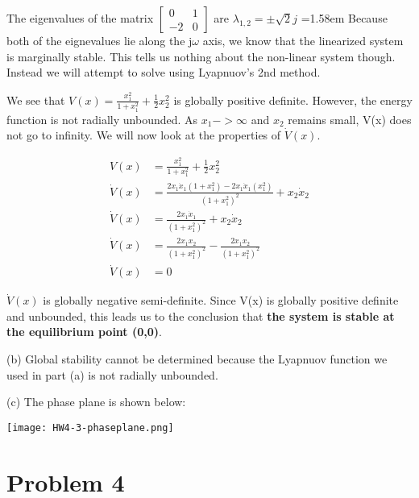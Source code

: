 \documentclass{article}
\begin{document}
  The eigenvalues of the matrix $\begin{bmatrix}
      0 & 1 \\
      -2 & 0
  \end{bmatrix}$ are $\lambda_{1,2} = \pm \sqrt{2}j$
  \newline
  \hangindent=1.58em
   Because both of the eignevalues lie along the j$\omega$ axis, we
  know that the linearized system is marginally stable. This tells us nothing
  about the non-linear system though. Instead we will attempt to solve using
  Lyapnuov's 2nd method. \newpage

  We see that $V(x)=\frac{x_1^2}{1+x_1^2}+\frac{1}{2}x_2^2$ is globally positive
  definite. However, the energy function is not radially unbounded. As
  $x_1 -> \infty$ and $x_2$ remains small, V(x) does not go to infinity.
  We will now look at the properties of $\dot{V}(x)$.

  \begin{align*}
    V(x) &= \frac{x_1^2}{1+x_1^2}+\frac{1}{2}x_2^2 \\
    \dot{V}(x) &= \frac{2x_1\dot{x}_1(1+x_1^2)-2x_1\dot{x}_1(x_1^2)}{(1+x_1^2)^2} + x_2\dot{x}_2 \\
    \dot{V}(x) &= \frac{2x_1\dot{x}_1}{(1+x_1^2)^2} + x_2\dot{x}_2 \\
    \dot{V}(x) &= \frac{2x_1x_2}{(1+x_1^2)^2} - \frac{2x_1x_2}{(1+x_1^2)^2} \\
    \dot{V}(x) &= 0
  \end{align*}
  
  $\dot{V}(x)$ is globally negative semi-definite. Since V(x) is
  globally positive definite and unbounded, this leads us to the conclusion that
  \textbf{the system is stable at the equilibrium point (0,0)}.

  (b) Global stability cannot be determined because the Lyapnuov function we
  used in part (a) is not radially unbounded. \newline

  (c) The phase plane is shown below: \newline
  \begin{center}
    \texttt{[image: HW4-3-phaseplane.png]} \newline \newline
  \end{center}
  \newpage

  \section{Problem 4}
\end{document}
